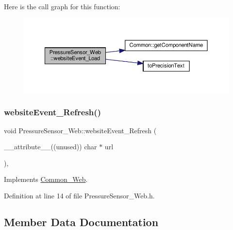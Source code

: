 Here is the call graph for this function\+:
\nopagebreak
\begin{figure}[H]
\begin{center}
\leavevmode
\includegraphics[width=350pt]{class_pressure_sensor___web_a235a466d2a93e7f53609c3113871c145_cgraph}
\end{center}
\end{figure}
\mbox{\label{class_pressure_sensor___web_adbab0e64b14442162327c42b358779a8}} 
\subsubsection{\texorpdfstring{website\+Event\+\_\+\+Refresh()}{websiteEvent\_Refresh()}}
{\footnotesize\ttfamily void Pressure\+Sensor\+\_\+\+Web\+::website\+Event\+\_\+\+Refresh (\begin{DoxyParamCaption}\item[{\+\_\+\+\_\+attribute\+\_\+\+\_\+((unused)) char $\ast$}]{url }\end{DoxyParamCaption})\hspace{0.3cm}{\ttfamily [inline]}, {\ttfamily [virtual]}}



Implements \hyperlink{class_common___web_aaca7c54fdcf908e4e1256b7b1f6fc212}{Common\+\_\+\+Web}.



Definition at line 14 of file Pressure\+Sensor\+\_\+\+Web.\+h.



\subsection{Member Data Documentation}
\mbox{\label{class_pressure_sensor___web_a872ae7f086766008667ee54572909836}} 

